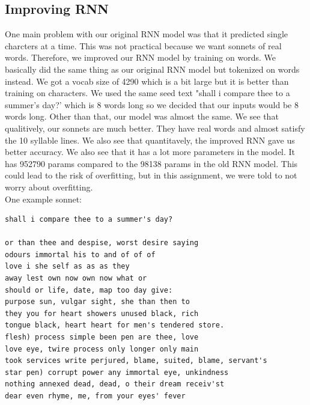 \subsection{Improving RNN}
One main problem with our original RNN model was that it predicted single charcters at a time. This was not practical because we want sonnets of real words. Therefore, we improved our RNN model by training on words. We basically did the same thing as our original RNN model but tokenized on words instead. We got a vocab size of 4290 which is a bit large but it is better than training on characters. We used the same seed text "shall i compare thee to a summer's day?' which is 8 words long so we decided that our inputs would be 8 words long. Other than that, our model was almost the same. We see that qualitively, our sonnets are much better. They have real words and almost satisfy the 10 syllable lines. We also see that quantitavely, the improved RNN gave us better accuracy. We also see that it has a lot more parameters in the model. It has 952790 params compared to the 98138 params in the old RNN model. This could lead to the risk of overfitting, but in this assignment, we were told to not worry about overfitting. \\
One example sonnet:
\begin{verbatim}
shall i compare thee to a summer's day?

or than thee and despise, worst desire saying
odours immortal his to and of of of
love i she self as as as they
away lest own now own now what or
should or life, date, map too day give:
purpose sun, vulgar sight, she than then to
they you for heart showers unused black, rich
tongue black, heart heart for men's tendered store.
flesh) process simple been pen are thee, love
love eye, twire process only longer only main
took services write perjured, blame, suited, blame, servant's
star pen) corrupt power any immortal eye, unkindness
nothing annexed dead, dead, o their dream receiv'st
dear even rhyme, me, from your eyes' fever
\end{verbatim}

\newpage

